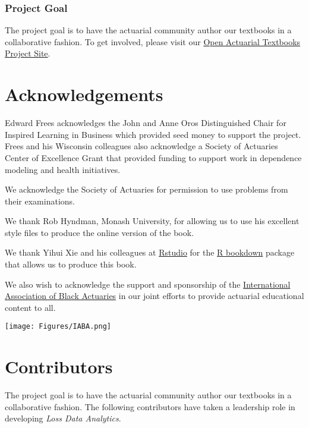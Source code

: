 \documentclass[]{book}
\begin{document}
\subsubsection*{Project Goal}\label{project-goal}

The project goal is to have the actuarial community author our textbooks
in a collaborative fashion. To get involved, please visit our
\href{https://sites.google.com/a/wisc.edu/loss-data-analytics/}{Open
Actuarial Textbooks Project Site}.

\section*{Acknowledgements}\label{acknowledgements}

Edward Frees acknowledges the John and Anne Oros Distinguished Chair for
Inspired Learning in Business which provided seed money to support the
project. Frees and his Wisconsin colleagues also acknowledge a Society
of Actuaries Center of Excellence Grant that provided funding to support
work in dependence modeling and health initiatives.

We acknowledge the Society of Actuaries for permission to use problems
from their examinations.

We thank Rob Hyndman, Monash University, for allowing us to use his
excellent style files to produce the online version of the book.

We thank Yihui Xie and his colleagues at
\href{https://www.rstudio.com/}{Rstudio} for the
\href{https://bookdown.org/yihui/bookdown/}{R bookdown} package that
allows us to produce this book.

We also wish to acknowledge the support and sponsorship of the
\href{http://www.blackactuaries.org/}{International Association of Black
Actuaries} in our joint efforts to provide actuarial educational content
to all.

\texttt{[image: Figures/IABA.png]}

\section*{Contributors}\label{contributors}

The project goal is to have the actuarial community author our textbooks
in a collaborative fashion. The following contributors have taken a
leadership role in developing \emph{Loss Data Analytics}.
\end{document}
